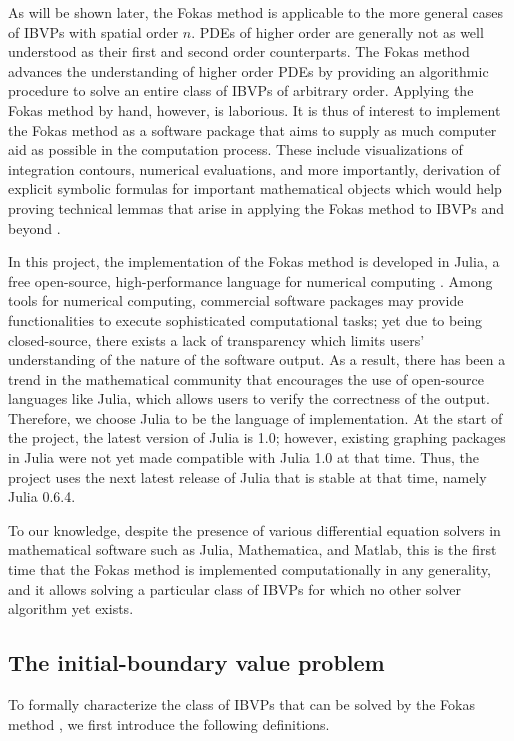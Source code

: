 \documentclass[12pt, oneside, a4paper]{article}
\begin{document}
As will be shown later, the Fokas method is applicable to the more general cases of IBVPs with spatial order $n$. PDEs of higher order are generally not as well understood as their first and second order counterparts. The Fokas method advances the understanding of higher order PDEs by providing an algorithmic procedure to solve an entire class of IBVPs of arbitrary order. Applying the Fokas method by hand, however, is laborious. It is thus of interest to implement the Fokas method as a software package that aims to supply as much computer aid as possible in the computation process. These include visualizations of integration contours, numerical evaluations, and more importantly, derivation of explicit symbolic formulas for important mathematical objects which would help proving technical lemmas that arise in applying the Fokas method to IBVPs \cite{Smith2012} and beyond \cite{Miller2018}.

In this project, the implementation of the Fokas method is developed in Julia, a free open-source, high-performance language for numerical computing \cite{julia}. Among tools for numerical computing, commercial software packages may provide functionalities to execute sophisticated computational tasks; yet due to being closed-source, there exists a lack of transparency which limits users' understanding of the nature of the software output. As a result, there has been a trend in the mathematical community that encourages the use of open-source languages like Julia, which allows users to verify the correctness of the output. Therefore, we choose Julia to be the language of implementation. At the start of the project, the latest version of Julia is 1.0; however, existing graphing packages in Julia were not yet made compatible with Julia 1.0 at that time. Thus, the project uses the next latest release of Julia that is stable at that time, namely Julia 0.6.4. 

To our knowledge, despite the presence of various differential equation solvers in mathematical software such as Julia, Mathematica, and Matlab, this is the first time that the Fokas method is implemented computationally in any generality, and it allows solving a particular class of IBVPs for which no other solver algorithm yet exists.

\subsection{The initial-boundary value problem}\label{sec:IBVP}
To formally characterize the class of IBVPs that can be solved by the Fokas method \cite[p.9]{Smith2016}, we first introduce the following definitions.
\end{document}
